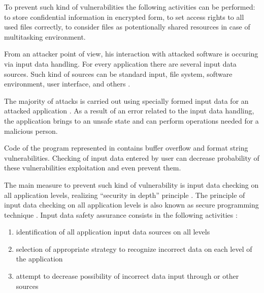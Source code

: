 %
To prevent such kind of vulnerabilities the following activities can be performed: to store confidential information in encrypted form, to set access rights to all used files correctly, to consider files as potentionally shared resources in case of multitasking environment. 



%
From an attacker point of view, his interaction with attacked software is occuring via input data handling. 
%
For every application there are several input data sources. 
%
Such kind of sources can be standard input, file system, software environment, user interface, and others  . 

%
The majority of attacks is carried out using specially formed input data for an attacked application . 
%
As a result of an error related to the input data handling, the application brings to an unsafe state and can perform operations needed for a malicious person. 

%
Code of the program represented in  contains buffer overflow and format string vulnerabilities. 
%
Checking of input data entered by user can decrease probability of these vulnerabilities exploitation and even prevent them. 

%
The main measure to prevent such kind of vulnerability is input data checking on all application levels, realizing ``security in depth'' principle . 
%
The principle of input data checking on all application levels is also known as secure programming technique . 
%
Input data safety assurance consists in the following activities : 
\begin{enumerate}
	\item identification of all application input data sources on all levels
	\item selection of appropriate strategy to recognize incorrect data on each level of the application
	\item attempt to decrease possibility of incorrect data input through  or other sources
\end{enumerate}

